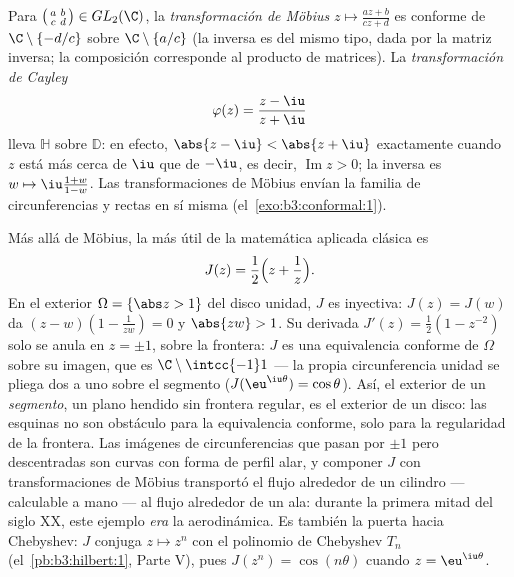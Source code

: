 \begin{example}
\label{ex:b3:conformal:mobius}
Para $\bigl(\begin{smallmatrix}a & b\\ c &
d\end{smallmatrix}\bigr) \in GL_2(\C)$, la \emph{transformación de
Möbius} $z \mapsto
\frac{az + b}{cz + d}$ es conforme de $\C\setminus\{-d/c\}$ sobre
$\C\setminus\{a/c\}$ (la inversa es del mismo tipo, dada por la matriz
inversa; la composición corresponde al producto de matrices). La
\emph{transformación de Cayley}
\[
\varphi(z) = \frac{z - \iu}{z + \iu}
\]
lleva $\mathbb H$ 
sobre $\mathbb D$: en efecto, $\abs{z
- \iu} < \abs{z + \iu}$ exactamente cuando $z$ está más cerca de $\iu$
que de $-\iu$, es decir, $\operatorname{Im}z > 0$; la inversa es
$w \mapsto \iu\frac{1 + w}{1 - w}$. Las transformaciones de Möbius
envían la familia de circunferencias y rectas en sí misma
(el~\cref{exo:b3:conformal:1}).
\end{example}

\begin{example}\label{ex:b3:conformal:joukowski}
Más allá de Möbius, la  más útil de la matemática aplicada clásica es
\[
J(z) = \frac12\Bigl(z + \frac1z\Bigr) .
\]
En el exterior $\Omega = \{\abs z > 1\}$ del disco unidad, $J$ es
inyectiva: $J(z) = J(w)$ da $(z - w)(1 -
\frac1{zw}) = 0$ y $\abs{zw} > 1$. Su derivada $J'(z) =
\frac12(1 - z^{-2})$ solo se anula en $z = \pm1$, sobre la frontera: $J$
es una equivalencia conforme de $\Omega$ sobre su imagen, que es
$\C\setminus\intcc{-1}1$ --- la propia circunferencia unidad se pliega
dos a uno sobre el segmento ($J(\eu^{\iu\theta}) = \cos\theta$). Así, el
exterior de un \emph{segmento}, un plano hendido sin frontera regular,
es  el exterior de un
disco: las esquinas no son obstáculo para la equivalencia conforme, solo
para la regularidad de la frontera. Las imágenes de circunferencias que
pasan por $\pm1$ pero descentradas son
curvas con forma de perfil alar, y componer $J$ con transformaciones de
Möbius transportó el flujo alrededor de un cilindro --- calculable a
mano --- al flujo alrededor de un ala: durante la primera mitad del
siglo XX, este ejemplo \emph{era} la aerodinámica. Es también la puerta
hacia Chebyshev: $J$ conjuga $z \mapsto z^n$ con el polinomio de
Chebyshev $T_n$ (el~\cref{pb:b3:hilbert:1}, Parte V), pues
$J(z^n) = \cos(n\theta)$ cuando $z = \eu^{\iu\theta}$.
\end{example}

